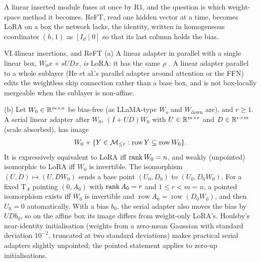 A linear inserted module fuses at once by R1, and the question is which weight-space method it becomes. ReFT, read one
hidden vector at a time, becomes LoRA on a box the network lacks, the identity, written in homogeneous coordinates
$(h,1)$ as $[I_d\mid0]$ so that its last column holds the bias.

\begin{proposition}{VI.4}{linear insertions, and ReFT}
(a) A linear adapter in parallel with a single linear box, $W_0x+sUDx$, \emph{is} LoRA: it has the same $\rho$
\citep[Table~1]{he2021unified}. A linear adapter parallel to a whole sublayer (He et al.'s parallel adapter around
attention or the FFN) edits the weightless skip connection rather than a base box, and is not box-locally mergeable when
the sublayer is non-affine.

(b) Let $W_0\in\mathbb{R}^{m\times n}$ be bias-free (as LLaMA-type $W_o$ and $W_{\mathrm{down}}$ are), and $r\ge1$. A serial
linear adapter after $W_0$, $(I+UD)W_0$ with $U\in\mathbb{R}^{m\times r}$ and $D\in\mathbb{R}^{r\times m}$ (scale absorbed), has image
\[W_0+\{Y\in\mathcal{M}_{\le r}:\operatorname{row}Y\subseteq\operatorname{row}W_0\}.\]
It is expressively equivalent to LoRA iff $\operatorname{rank} W_0=n$, and weakly (unpointed) isomorphic to LoRA iff $W_0$ is invertible.
The isomorphism $(U,D)\mapsto(U,DW_0)$ sends a base point $(U_0,D_0)$ to $(U_0,D_0W_0)$. For a fixed $\mathrm T_A$
pointing $(0,A_0)$ with $\operatorname{rank} A_0=r$ and $1\le r<m=n$, a pointed isomorphism exists iff $W_0$ is invertible and
$\operatorname{row}A_0=\operatorname{row}(D_0W_0)$, and then $U_0=0$ automatically. With a bias $b_0$, the serial adapter
also moves the bias by $UDb_0$, so on the affine box its image differs from weight-only LoRA's. Houlsby's near-identity
initialisation (weights from a zero-mean Gaussian with standard deviation $10^{-2}$, truncated at two standard
deviations) makes practical serial adapters slightly unpointed; the pointed statement applies to zero-up
initialisations.


\end{proposition}
